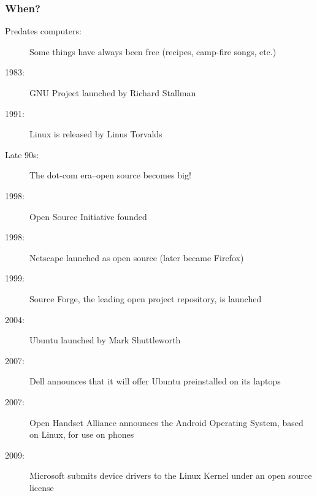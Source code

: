 \documentclass{beamer}
\begin{document}
\begin{frame}
  \frametitle{When?}

  \begin{description}
  \item[Predates computers:] Some things have always been free (recipes, camp-fire songs, etc.)
  \item[1983:] GNU Project launched by Richard Stallman
  \item[1991:] Linux is released by Linus Torvalds
  \item[Late 90s:] The dot-com era--open source becomes big!
  \item[1998:] Open Source Initiative founded
  \item[1998:] Netscape launched as open source (later became Firefox)
  \item[1999:] Source Forge, the leading open project repository, is launched
  \item[2004:] Ubuntu launched by Mark Shuttleworth
  \item[2007:] Dell announces that it will offer Ubuntu preinstalled on its laptops
  \item[2007:] Open Handset Alliance announces the Android Operating System, based on Linux, for use on phones
  \item[2009:] Microsoft submits device drivers to the Linux Kernel under an open source license
  \end{description}
\end{frame}
\end{document}
